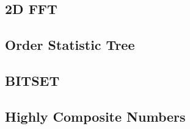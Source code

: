 \documentclass[10pt,landscape,a4paper,twocolumn]{article}
\begin{document}
\subsection{2D FFT}


\subsection{Order Statistic Tree}


\subsection{BITSET}


\subsection{Highly Composite Numbers}



\clearpage
\null
\clearpage
\null
\clearpage
\null
\clearpage
\null
\clearpage
\null
\end{document}
